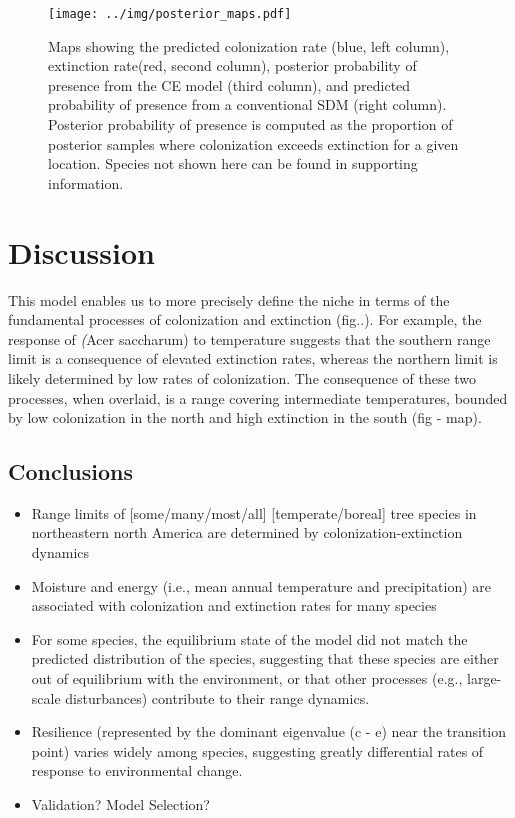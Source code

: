 \documentclass[11pt]{article}
\begin{document}
\begin{figure}
	\texttt{[image: ../img/posterior\_maps.pdf]}
	\caption{
		Maps showing the predicted colonization rate (blue, left column), extinction rate(red, second column), posterior probability of presence from the CE model (third column), and predicted probability of presence from a conventional SDM (right column).
		Posterior probability of presence is computed as the proportion of posterior samples where colonization exceeds extinction for a given location.
		Species not shown here can be found in supporting information.
	}
	\label{fig:response_curves}
\end{figure}


\section*{Discussion}

This model enables us to more precisely define the niche in terms of the fundamental processes of colonization and extinction (fig..). 
For example, the response of \emph(Acer saccharum) to temperature suggests that the southern range limit is a consequence of elevated extinction rates, whereas the northern limit is likely determined by low rates of colonization.
The consequence of these two processes, when overlaid, is a range covering intermediate temperatures, bounded by low colonization in the north and high extinction in the south (fig - map).


\subsection*{Conclusions}
\begin{itemize}
	\item Range limits of [some/many/most/all] [temperate/boreal] tree species in northeastern north America are determined by colonization-extinction dynamics
	\item Moisture and energy (i.e., mean annual temperature and precipitation) are associated with colonization and extinction rates for many species
	\item For some species, the equilibrium state of the model did not match the predicted distribution of the species, suggesting that these species are either out of equilibrium with the environment, or that other processes (e.g., large-scale disturbances) contribute to their range dynamics.
	\item Resilience (represented by the dominant eigenvalue (c - e) near the transition point) varies widely among species, suggesting greatly differential rates of response to environmental change.
	\item Validation? Model Selection?
\end{itemize}
\end{document}
